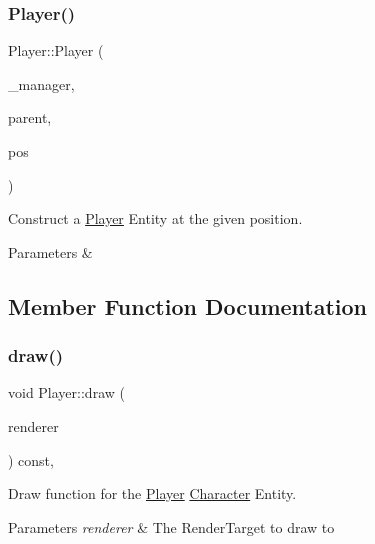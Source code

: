\subsubsection{\texorpdfstring{Player()}{Player()}\hspace{0.1cm}{\footnotesize\ttfamily [3/3]}}
{\footnotesize\ttfamily Player\+::\+Player (\begin{DoxyParamCaption}\item[{\mbox{\hyperlink{class_game_manager}{Game\+Manager}} $\ast$}]{\+\_\+manager,  }\item[{\mbox{\hyperlink{class_game_entity}{Game\+Entity}} $\ast$}]{parent,  }\item[{\mbox{\hyperlink{classsf_1_1_vector2}{sf\+::\+Vector2f}}}]{pos }\end{DoxyParamCaption})}



Construct a \mbox{\hyperlink{class_player}{Player}} Entity at the given position. 


\begin{DoxyParams}{Parameters}
{\em } & \\
\hline
\end{DoxyParams}


\subsection{Member Function Documentation}
\mbox{\label{class_player_aa89ab3b084fe95cb2f83e34b8163b126}} 
\subsubsection{\texorpdfstring{draw()}{draw()}}
{\footnotesize\ttfamily void Player\+::draw (\begin{DoxyParamCaption}\item[{\mbox{\hyperlink{classsf_1_1_render_target}{sf\+::\+Render\+Target}} \&}]{renderer }\end{DoxyParamCaption}) const\hspace{0.3cm}{\ttfamily [override]}, {\ttfamily [virtual]}}



Draw function for the \mbox{\hyperlink{class_player}{Player}} \mbox{\hyperlink{class_character}{Character}} Entity. 


\begin{DoxyParams}{Parameters}
{\em renderer} & The Render\+Target to draw to \\
\hline
\end{DoxyParams}


